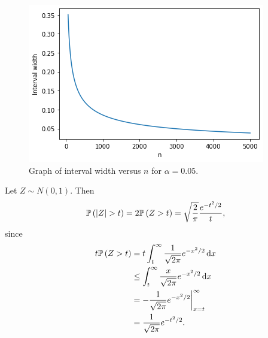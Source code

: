 \begin{ex}
\begin{enumerate}[(a)]
          \begin{figure}[H]
            \centering
            \includegraphics[scale=0.7]{part1/ch04-04c}
            \caption{Graph of interval width versus $n$ for $\alpha=0.05$.}
          \end{figure}
  \end{enumerate}
\end{ex}

\begin{ex}
  Let $Z\sim N(0, 1)$. Then
  \[
    \P{|Z|>t}
    =2\P{Z>t}
    =\sqrt{\frac{2}{\pi}}\frac{e^{-t^2/2}}{t},
  \]
  since
  \begin{align*}
    t\mathbb{P}\left(Z>t\right)
     & =t\int_t^\infty \frac{1}{\sqrt{2\pi}}e^{-x^2/2}\,\mathrm{d}{x}    \\
     & \leq \int_t^\infty \frac{x}{\sqrt{2\pi}}e^{-x^2/2}\,\mathrm{d}{x} \\
     & =-\frac{1}{\sqrt{2\pi}}e^{-x^2/2}\bigg\rvert_{x=t}^\infty \\
     & =\frac{1}{\sqrt{2\pi}}e^{-t^2/2}.
  \end{align*}
\end{ex}

